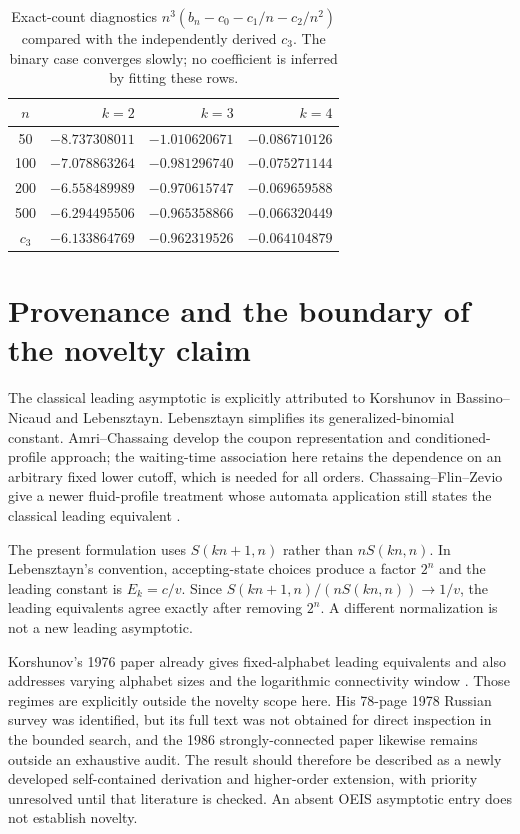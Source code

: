 \documentclass[11pt,letterpaper]{article}
\theoremstyle{remark}\newtheorem{remark}[theorem]{Remark}
\numberwithin{equation}{section}
\begin{document}
\begin{table}[ht]
\centering
\begin{tabular}{crrr}
\toprule
$n$&$k=2$&$k=3$&$k=4$\\
\midrule
50&$-8.737308011$&$-1.010620671$&$-0.086710126$\\
100&$-7.078863264$&$-0.981296740$&$-0.075271144$\\
200&$-6.558489989$&$-0.970615747$&$-0.069659588$\\
500&$-6.294495506$&$-0.965358866$&$-0.066320449$\\
\midrule
$c_3$&$-6.133864769$&$-0.962319526$&$-0.064104879$\\
\bottomrule
\end{tabular}
\caption{Exact-count diagnostics $n^3(b_n-c_0-c_1/n-c_2/n^2)$ compared with the independently derived $c_3$. The binary case converges slowly; no coefficient is inferred by fitting these rows.}
\end{table}

\section{Provenance and the boundary of the novelty claim}\label{asa:acc:sec:provenance}
The classical leading asymptotic is explicitly attributed to Korshunov in Bassino--Nicaud and Lebensztayn. Lebensztayn simplifies its generalized-binomial constant. Amri--Chassaing develop the coupon representation and conditioned-profile approach; the waiting-time association here retains the dependence on an arbitrary fixed lower cutoff, which is needed for all orders. Chassaing--Flin--Zevio give a newer fluid-profile treatment whose automata application still states the classical leading equivalent \cite{impatient,pascal}.

The present formulation uses $S(kn+1,n)$ rather than $nS(kn,n)$. In Lebensztayn's convention, accepting-state choices produce a factor $2^n$ and the leading constant is $E_k=c/v$. Since $S(kn+1,n)/(nS(kn,n))\to1/v$, the leading equivalents agree exactly after removing $2^n$. A different normalization is not a new leading asymptotic.

Korshunov's 1976 paper already gives fixed-alphabet leading equivalents and also addresses varying alphabet sizes and the logarithmic connectivity window \cite{korshunov1976}. Those regimes are explicitly outside the novelty scope here. His 78-page 1978 Russian survey was identified, but its full text was not obtained for direct inspection in the bounded search, and the 1986 strongly-connected paper likewise remains outside an exhaustive audit. The result should therefore be described as a newly developed self-contained derivation and higher-order extension, with priority unresolved until that literature is checked. An absent OEIS asymptotic entry does not establish novelty.
\end{document}
